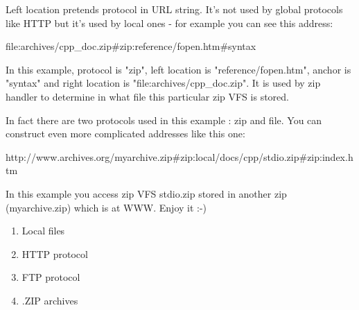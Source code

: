 
Left location pretends protocol in URL string. 
It's not used by global protocols like HTTP but it's used
by local ones - for example you can see this address:

file:archives/cpp\_doc.zip\#zip:reference/fopen.htm\#syntax

In this example, protocol is "zip", left location is
"reference/fopen.htm", anchor is "syntax" and right location
is "file:archives/cpp_doc.zip". It is used by zip handler
to determine in what file this particular zip VFS is stored.

In fact there are two protocols used in this example : zip and file.
You can construct even more complicated addresses like this one:

http://www.archives.org/myarchive.zip\#zip:local/docs/cpp/stdio.zip\#zip:index.htm

In this example you access zip VFS stdio.zip stored in another zip (myarchive.zip)
which is at WWW. Enjoy it :-)


\begin{enumerate}
\item Local files
\item HTTP protocol
\item FTP protocol
\item .ZIP archives
\end{enumerate}

